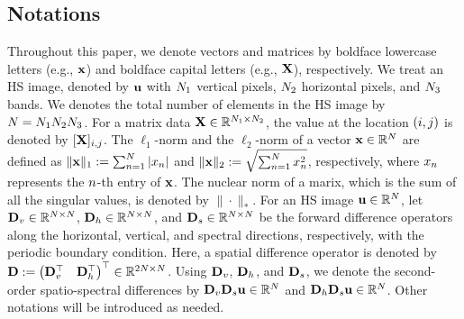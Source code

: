 \documentclass[10pt,journal]{IEEEtran}
\begin{document}
\subsection{Notations}
\label{subsec:Notations}
Throughout this paper, we denote vectors and matrices by boldface lowercase letters (e.g., $\mathbf{x}$) and boldface capital letters (e.g., $\mathbf{X}$), respectively.
We treat an HS image, denoted by $\mathbf{u}$ with $N_{1}$ vertical pixels, $N_{2}$ horizontal pixels, and $N_{3}$ bands.
We denotes the total number of elements in the HS image by $N = N_{1} N_{2} N_{3}$.
For a matrix data $\mathbf{X} \in \mathbb{R}^{N_{1} \times N_{2}}$, the value at the location $(i, j)$ is denoted by $[\mathbf{X}]_{i,j}$.
The $\ell_{1}$-norm and the $\ell_{2}$-norm of a vector $\mathbf{x} \in \mathbb{R}^{N}$ are defined as $\| \mathbf{x} \|_{1} := \sum_{n=1}^{N} | x_{n} |$ and $\| \mathbf{x} \|_{2} := \sqrt{\sum_{n=1}^{N} x_{n}^{2}}$, respectively, where  $x_{n}$ represents the $n$-th entry of $\mathbf{x}$.
The nuclear norm of a marix, which is the sum of all the singular values, is denoted by $\| \cdot \|_{*}$.
For an HS image $\mathbf{u} \in \mathbb{R}^{N}$, let $\mathbf{D}_{v} \in \mathbb{R}^{N \times N}$, $\mathbf{D}_{h} \in \mathbb{R}^{N \times N}$, and $\mathbf{D}_{s} \in \mathbb{R}^{N \times N}$ be the forward difference operators along the horizontal, vertical, and spectral directions, respectively, with the periodic boundary condition.
Here, a spatial difference operator is denoted by $\mathbf{D} := \begin{pmatrix} \mathbf{D}_{v}^{\top} & \mathbf{D}_{h}^{\top} \end{pmatrix}^{\top} \in \mathbb{R}^{2 N \times N}$. 
Using $\mathbf{D}_{v}$, $\mathbf{D}_{h}$, and $\mathbf{D}_{s}$, we denote the second-order spatio-spectral differences by $\mathbf{D}_{v} \mathbf{D}_{s} \mathbf{u} \in \mathbb{R}^{N}$ and $\mathbf{D}_{h} \mathbf{D}_{s} \mathbf{u} \in \mathbb{R}^{N}$.
Other notations will be introduced as needed.
\end{document}
